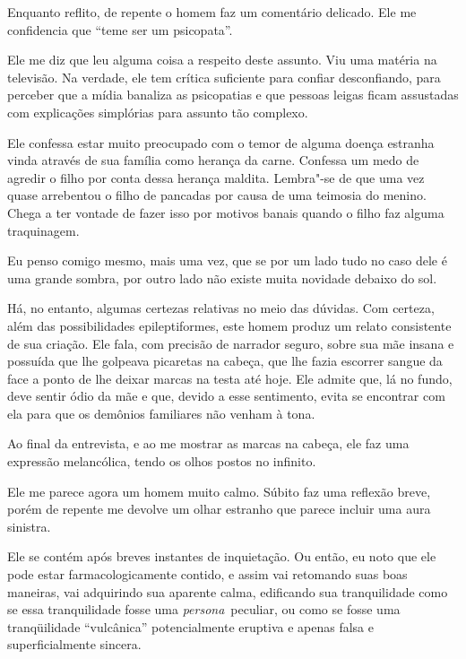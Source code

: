 Enquanto reflito, de repente o homem faz um comentário delicado. Ele me
confidencia que ``teme ser um psicopata''.

Ele me diz que leu alguma coisa a respeito deste assunto. Viu uma
matéria na televisão. Na verdade, ele tem crítica suficiente para
confiar desconfiando, para perceber que a mídia banaliza as psicopatias
e que pessoas leigas ficam assustadas com explicações simplórias para
assunto tão complexo.

Ele confessa estar muito preocupado com o temor de alguma doença
estranha vinda através de sua família como herança da carne. Confessa um
medo de agredir o filho por conta dessa herança maldita. Lembra"-se de
que uma vez quase arrebentou o filho de pancadas por causa de uma
teimosia do menino. Chega a ter vontade de fazer isso por motivos banais
quando o filho faz alguma traquinagem.

\asterisc{}

Eu penso comigo mesmo, mais uma vez, que se por um lado tudo no caso
dele é uma grande sombra, por outro lado não existe muita novidade
debaixo do sol.

Há, no entanto, algumas certezas relativas no meio das dúvidas. Com
certeza, além das possibilidades epileptiformes, este homem produz um
relato consistente de sua criação. Ele fala, com precisão de narrador
seguro, sobre sua mãe insana e possuída que lhe golpeava picaretas na
cabeça, que lhe fazia escorrer sangue da face a ponto de lhe deixar
marcas na testa até hoje. Ele admite que, lá no fundo, deve sentir ódio
da mãe e que, devido a esse sentimento, evita se encontrar com ela para
que os demônios familiares não venham à tona.

Ao final da entrevista, e ao me mostrar as marcas na cabeça, ele faz uma
expressão melancólica, tendo os olhos postos no infinito.

\asterisc{}

Ele me parece agora um homem muito calmo. Súbito faz uma reflexão breve,
porém de repente me devolve um olhar estranho que parece incluir uma
aura sinistra.

Ele se contém após breves instantes de inquietação. Ou então, eu noto
que ele pode estar farmacologicamente contido, e assim vai retomando
suas boas maneiras, vai adquirindo sua aparente calma, edificando sua
tranquilidade como se essa tranquilidade fosse uma
\emph{persona}~peculiar, ou como se fosse uma tranqüilidade
``vulcânica'' potencialmente eruptiva e apenas falsa e superficialmente
sincera.~

